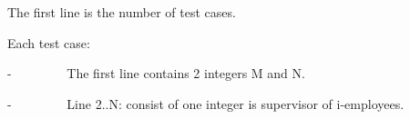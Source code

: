 The first line is the number of test cases.  

   Each test case:  

   -         The first line contains 2 integers M and N.  

   -         Line 2..N: consist of one integer is supervisor of i-employees.